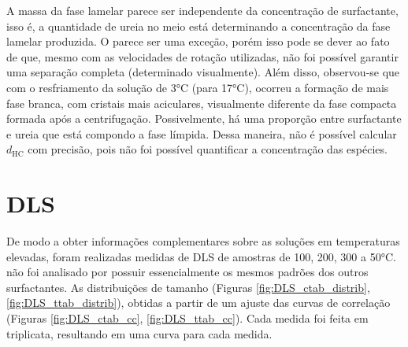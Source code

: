 	A massa da fase lamelar parece ser independente da concentração de surfactante, isso é, a quantidade de ureia no meio está determinando a concentração da fase lamelar produzida. O \CTAB{} parece ser uma exceção, porém isso pode se dever ao fato de que, mesmo com as velocidades de rotação utilizadas, não foi possível garantir uma separação completa (determinado visualmente). Além disso, observou-se que com o resfriamento da solução de 3°C (para 17°C), ocorreu a formação de mais fase branca, com cristais mais aciculares, visualmente diferente da fase compacta formada após a centrifugação. Possivelmente, há uma proporção entre surfactante e ureia que está compondo a fase límpida. Dessa maneira, não é possível calcular \(d_\mathrm{HC}\) com precisão, pois não foi possível quantificar a concentração das espécies. 
	\FloatBarrier
\section{DLS}
\label{sec:Ureia-DLS}

	De modo a obter informações complementares sobre as soluções em temperaturas elevadas, foram realizadas medidas de DLS de amostras de \CTTAB{} 100, 200, 300 \mM{} a 50°C. \DTAB{} não foi analisado por possuir essencialmente os mesmos padrões dos outros surfactantes. As distribuições de tamanho (Figuras \ref{fig:DLS_ctab_distrib}, \ref{fig:DLS_ttab_distrib}), obtidas a partir de um ajuste das curvas de correlação (Figuras \ref{fig:DLS_ctab_cc}, \ref{fig:DLS_ttab_cc}). Cada medida foi feita em triplicata, resultando em uma curva para cada medida.
	

